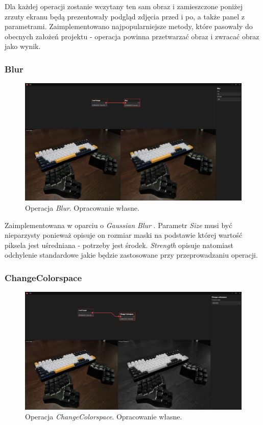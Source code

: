 Dla każdej operacji zostanie wczytany ten sam obraz i zamieszczone poniżej zrzuty ekranu będą prezentowały podgląd zdjęcia przed i po, a także panel z parametrami.
Zaimplementowano najpopularniejsze \cite{mostpop} metody, które pasowały do obecnych założeń projektu - operacja powinna przetwarzać obraz i zwracać obraz jako wynik.
\subsubsection{Blur}
\begin{figure}[H]
    \centering
    \includegraphics[width=1\linewidth]{images/Picture22.jpg}
    \caption{Operacja \textit{Blur}. Opracowanie własne.}
    \label{fig:blur}
\end{figure}

Zaimplementowana w oparciu o \textit{Gaussian Blur} \cite{gauss}. Parametr \textit{Size} musi być nieparzysty ponieważ opisuje on rozmiar maski na podstawie której wartość piksela jest uśredniana - potrzeby jest środek. \textit{Strength} opisuje natomiast odchylenie standardowe jakie będzie zastosowane przy przeprowadzaniu operacji.

\subsubsection{ChangeColorspace}

\begin{figure}[H]
    \centering
    \includegraphics[width=1\linewidth]{images/Picture23.jpg}
    \caption{Operacja \textit{ChangeColorspace}. Opracowanie własne.}
    \label{fig:colorconv}
\end{figure}

